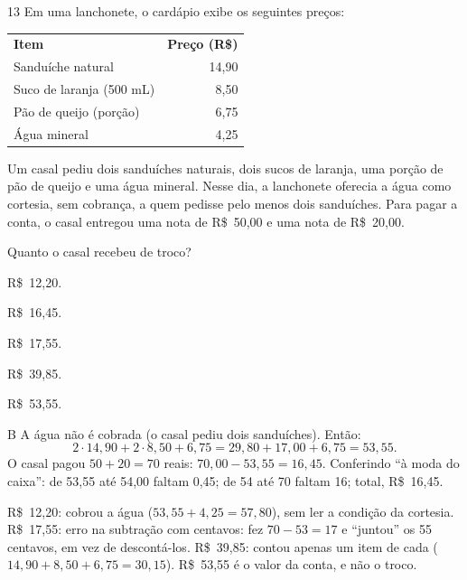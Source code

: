 \secaoineditas

\begin{questaoinedita}{1}{3}
Em uma lanchonete, o cardápio exibe os seguintes preços:
\begin{center}
\small
\renewcommand{\arraystretch}{1.2}
\begin{tabular}{lr}
\rowcolor{ebookLight}\textbf{Item} & \textbf{Preço (R\$)}\\
Sanduíche natural & 14,90\\
Suco de laranja (500 mL) & 8,50\\
Pão de queijo (porção) & 6,75\\
Água mineral & 4,25\\
\end{tabular}
\end{center}
Um casal pediu dois sanduíches naturais, dois sucos de laranja, uma porção de pão de queijo e uma
água mineral. Nesse dia, a lanchonete oferecia a água como cortesia, sem cobrança, a quem pedisse
pelo menos dois sanduíches. Para pagar a conta, o casal entregou uma nota de R\$~50,00 e uma nota
de R\$~20,00.

Quanto o casal recebeu de troco?
\begin{alternativas*}[5]
\item R\$~12,20.
\item R\$~16,45.
\item R\$~17,55.
\item R\$~39,85.
\item R\$~53,55.
\end{alternativas*}
\end{questaoinedita}
\begin{resolucao}{B}
 A água não é cobrada (o casal pediu dois sanduíches). Então:
\[2\cdot 14,90+2\cdot 8,50+6,75=29,80+17,00+6,75=53,55.\]
 O casal pagou $50+20=70$ reais: $70,00-53,55=16,45$.
Conferindo ``à moda do caixa'': de 53,55 até 54,00 faltam 0,45; de 54 até 70 faltam 16;
total, R\$~16,45.
\begin{distratores}
 R\$~12,20: cobrou a água ($53,55+4,25=57,80$), sem ler a condição da cortesia.
 R\$~17,55: erro na subtração com centavos: fez $70-53=17$ e ``juntou'' os 55 centavos, em vez
de descontá-los.
 R\$~39,85: contou apenas um item de cada ($14,90+8,50+6,75=30,15$).
 R\$~53,55 é o valor da conta, e não o troco.
\end{distratores}
\end{resolucao}

